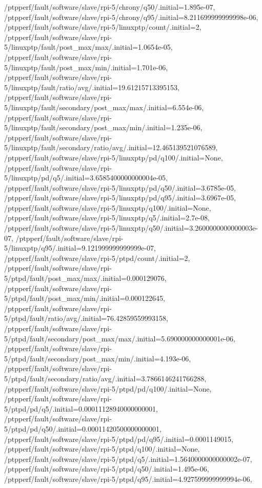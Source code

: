{    /ptpperf/fault/software/slave/rpi-5/chrony/q50/.initial=1.895e-07,
    /ptpperf/fault/software/slave/rpi-5/chrony/q95/.initial=8.211699999999998e-06,
    /ptpperf/fault/software/slave/rpi-5/linuxptp/count/.initial=2,
    /ptpperf/fault/software/slave/rpi-5/linuxptp/fault/post_max/max/.initial=1.0654e-05,
    /ptpperf/fault/software/slave/rpi-5/linuxptp/fault/post_max/min/.initial=1.701e-06,
    /ptpperf/fault/software/slave/rpi-5/linuxptp/fault/ratio/avg/.initial=19.61215713395153,
    /ptpperf/fault/software/slave/rpi-5/linuxptp/fault/secondary/post_max/max/.initial=6.554e-06,
    /ptpperf/fault/software/slave/rpi-5/linuxptp/fault/secondary/post_max/min/.initial=1.235e-06,
    /ptpperf/fault/software/slave/rpi-5/linuxptp/fault/secondary/ratio/avg/.initial=12.465139521076589,
    /ptpperf/fault/software/slave/rpi-5/linuxptp/pd/q100/.initial=None,
    /ptpperf/fault/software/slave/rpi-5/linuxptp/pd/q5/.initial=3.6585400000000004e-05,
    /ptpperf/fault/software/slave/rpi-5/linuxptp/pd/q50/.initial=3.6785e-05,
    /ptpperf/fault/software/slave/rpi-5/linuxptp/pd/q95/.initial=3.6967e-05,
    /ptpperf/fault/software/slave/rpi-5/linuxptp/q100/.initial=None,
    /ptpperf/fault/software/slave/rpi-5/linuxptp/q5/.initial=2.7e-08,
    /ptpperf/fault/software/slave/rpi-5/linuxptp/q50/.initial=3.2600000000000003e-07,
    /ptpperf/fault/software/slave/rpi-5/linuxptp/q95/.initial=9.121999999999999e-07,
    /ptpperf/fault/software/slave/rpi-5/ptpd/count/.initial=2,
    /ptpperf/fault/software/slave/rpi-5/ptpd/fault/post_max/max/.initial=0.000129076,
    /ptpperf/fault/software/slave/rpi-5/ptpd/fault/post_max/min/.initial=0.000122645,
    /ptpperf/fault/software/slave/rpi-5/ptpd/fault/ratio/avg/.initial=76.42859559993158,
    /ptpperf/fault/software/slave/rpi-5/ptpd/fault/secondary/post_max/max/.initial=5.690000000000001e-06,
    /ptpperf/fault/software/slave/rpi-5/ptpd/fault/secondary/post_max/min/.initial=4.193e-06,
    /ptpperf/fault/software/slave/rpi-5/ptpd/fault/secondary/ratio/avg/.initial=3.7866146241766288,
    /ptpperf/fault/software/slave/rpi-5/ptpd/pd/q100/.initial=None,
    /ptpperf/fault/software/slave/rpi-5/ptpd/pd/q5/.initial=0.00011128940000000001,
    /ptpperf/fault/software/slave/rpi-5/ptpd/pd/q50/.initial=0.00011420500000000001,
    /ptpperf/fault/software/slave/rpi-5/ptpd/pd/q95/.initial=0.0001149015,
    /ptpperf/fault/software/slave/rpi-5/ptpd/q100/.initial=None,
    /ptpperf/fault/software/slave/rpi-5/ptpd/q5/.initial=1.5640000000000002e-07,
    /ptpperf/fault/software/slave/rpi-5/ptpd/q50/.initial=1.495e-06,
    /ptpperf/fault/software/slave/rpi-5/ptpd/q95/.initial=4.927599999999994e-06,
}
